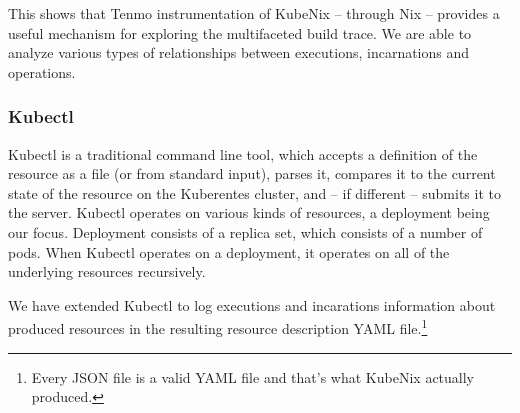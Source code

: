 
This shows that Tenmo instrumentation of KubeNix -- through Nix -- provides a useful mechanism for exploring the multifaceted build trace. We are able to analyze various types of relationships between executions, incarnations and operations.

\subsubsection{Kubectl}\label{sec:kubectl}

Kubectl is a traditional command line tool, which accepts a definition of the resource as a file (or from standard input), parses it, compares it to the current state of the resource on the Kuberentes cluster, and -- if different -- submits it to the server. Kubectl operates on various kinds of resources, a deployment being our focus. Deployment consists of a replica set, which consists of a number of pods. When Kubectl operates on a deployment, it operates on all of the underlying resources recursively.

We have extended Kubectl to log executions and incarations information about produced resources in the resulting resource description YAML file.\footnote{Every JSON file is a valid YAML file and that's what KubeNix actually produced.}

